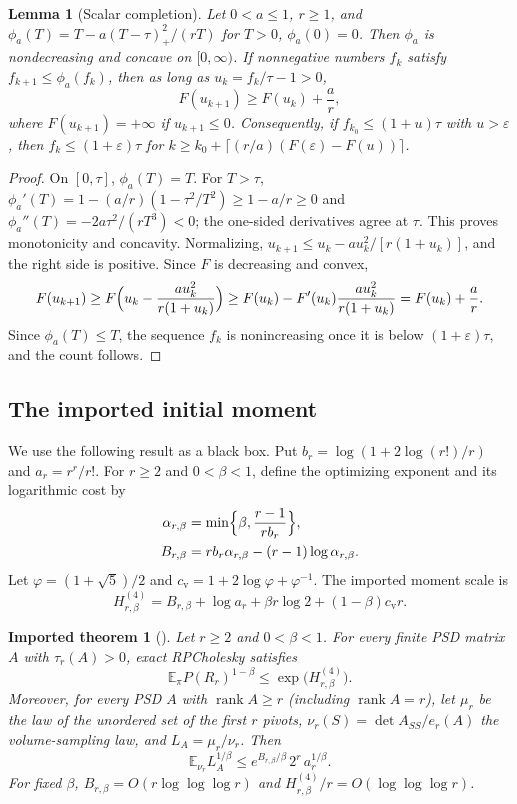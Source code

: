 \documentclass[11pt]{article}
\newtheorem{lemma}[theorem]{Lemma}
\newtheorem{imported}[theorem]{Imported theorem}
\theoremstyle{definition}\newtheorem{definition}[theorem]{Definition}
\theoremstyle{remark}\newtheorem{remark}[theorem]{Remark}
\newcommand{\E}{\mathbb E}
\newcommand{\eps}{\varepsilon}
\newcommand{\rank}{\operatorname{rank}}
\newcommand{\cvol}{c_{\mathrm v}}
\newcommand{\1}{\mathbf 1}
\begin{document}
\begin{lemma}[Scalar completion]\label{lem:scalar}
Let $0<a\le1$, $r\ge1$, and $\phi_a(T)=T-a(T-\tau)_+^2/(rT)$ for
$T>0$, $\phi_a(0)=0$. Then $\phi_a$ is nondecreasing and concave on
$[0,\infty)$. If nonnegative numbers $f_k$ satisfy
$f_{k+1}\le\phi_a(f_k)$, then as long as $u_k=f_k/\tau-1>0$,
\[
 F(u_{k+1})\ge F(u_k)+\frac ar ,
\]
where $F(u_{k+1})=+\infty$ if $u_{k+1}\le0$. Consequently, if
$f_{k_0}\le(1+u)\tau$ with $u>\eps$, then $f_k\le(1+\eps)\tau$ for
$k\ge k_0+\lceil(r/a)(F(\eps)-F(u))\rceil$.
\end{lemma}
\begin{proof}
On $[0,\tau]$, $\phi_a(T)=T$. For $T>\tau$,
$\phi_a'(T)=1-(a/r)(1-\tau^2/T^2)\ge1-a/r\ge0$ and
$\phi_a''(T)=-2a\tau^2/(rT^3)<0$; the one-sided derivatives agree at
$\tau$. This proves monotonicity and concavity. Normalizing,
$u_{k+1}\le u_k-au_k^2/[r(1+u_k)]$, and the right side is positive.
Since $F$ is decreasing and convex,
\[
 F(u_{k+1})\ge F\Bigl(u_k-\frac{au_k^2}{r(1+u_k)}\Bigr)
 \ge F(u_k)-F'(u_k)\frac{au_k^2}{r(1+u_k)}=F(u_k)+\frac ar .
\]
Since $\phi_a(T)\le T$, the sequence $f_k$ is nonincreasing once it is
below $(1+\eps)\tau$, and the count follows.
\end{proof}

\subsection{The imported initial moment}
We use the following result as a black box. Put
$b_r=\log(1+2\log(r!)/r)$ and $a_r=r^r/r!$. For $r\ge2$ and
$0<\beta<1$, define the optimizing exponent and its logarithmic cost by
\begin{align*}
 \alpha_{r,\beta}&=\min\Bigl\{\beta,\frac{r-1}{rb_r}\Bigr\},\\
 B_{r,\beta}&=rb_r\alpha_{r,\beta}-(r-1)\log\alpha_{r,\beta}.
\end{align*}
Let $\varphi=(1+\sqrt5)/2$ and
$\cvol=1+2\log\varphi+\varphi^{-1}$. The imported moment scale is
\begin{equation}\label{eq:H4}
 H_{r,\beta}^{(4)}=B_{r,\beta}+\log a_r+\beta r\log2+(1-\beta)\cvol r .
\end{equation}

\begin{imported}[{\cite[Proposition 7.2 and Theorem 6.3]{RA01}}]\label{imp:four}
Let $r\ge2$ and $0<\beta<1$. For every finite PSD matrix $A$ with
$\tau_r(A)>0$, exact RPCholesky satisfies
\begin{equation}\label{eq:imp-moment}
 \E_\pi P(R_r)^{1-\beta}\le\exp\bigl(H_{r,\beta}^{(4)}\bigr).
\end{equation}
Moreover, for every PSD $A$ with $\rank A\ge r$ (including
$\rank A=r$), let $\mu_r$ be the law of the unordered set of the first
$r$ pivots, $\nu_r(S)=\det A_{SS}/e_r(A)$ the volume-sampling law, and
$L_A=\mu_r/\nu_r$. Then
\begin{equation}\label{eq:imp-renyi}
 \E_{\nu_r}L_A^{1/\beta}\le e^{B_{r,\beta}/\beta}\,2^r\,a_r^{1/\beta}.
\end{equation}
For fixed $\beta$, $B_{r,\beta}=O(r\log\log\log r)$ and
$H_{r,\beta}^{(4)}/r=O(\log\log\log r)$.
\end{imported}
\end{document}
